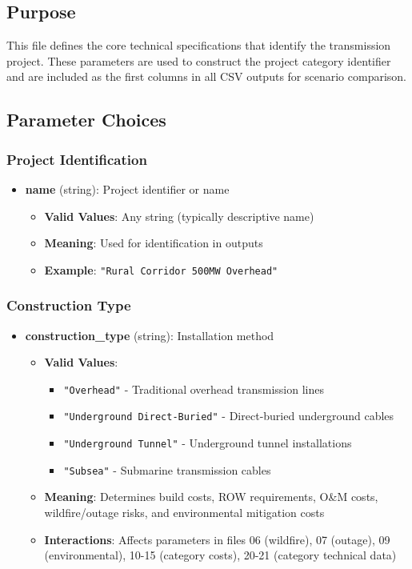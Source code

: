 \documentclass[ctcc_full_documentation.tex]{subfiles}
\begin{document}
\subsection{Purpose}

This file defines the core technical specifications that identify the transmission project. These parameters are used to construct the project category identifier and are included as the first columns in all CSV outputs for scenario comparison.

\subsection{Parameter Choices}

\subsubsection{Project Identification}

\begin{itemize}
    \item \textbf{name} (string): Project identifier or name
    \begin{itemize}
        \item \textbf{Valid Values}: Any string (typically descriptive name)
        \item \textbf{Meaning}: Used for identification in outputs
        \item \textbf{Example}: \texttt{"Rural Corridor 500MW Overhead"}
    \end{itemize}
\end{itemize}

\subsubsection{Construction Type}

\begin{itemize}
    \item \textbf{construction\_type} (string): Installation method
    \begin{itemize}
        \item \textbf{Valid Values}: 
        \begin{itemize}
            \item \texttt{"Overhead"} - Traditional overhead transmission lines
            \item \texttt{"Underground Direct-Buried"} - Direct-buried underground cables
            \item \texttt{"Underground Tunnel"} - Underground tunnel installations
            \item \texttt{"Subsea"} - Submarine transmission cables
        \end{itemize}
        \item \textbf{Meaning}: Determines build costs, ROW requirements, O\&M costs, wildfire/outage risks, and environmental mitigation costs
        \item \textbf{Interactions}: Affects parameters in files 06 (wildfire), 07 (outage), 09 (environmental), 10-15 (category costs), 20-21 (category technical data)
    \end{itemize}
\end{itemize}
\end{document}
